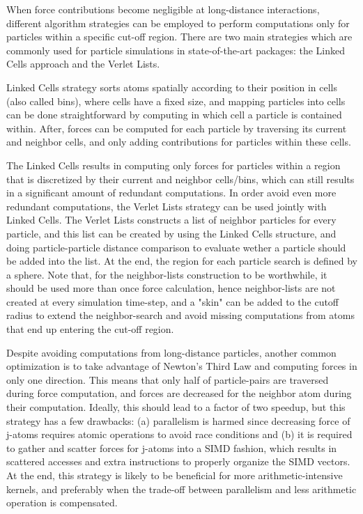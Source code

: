 \documentclass[preprint,12pt]{elsarticle}
\begin{document}
When force contributions become negligible at long-distance interactions, different algorithm strategies can be employed to perform computations only for particles within a specific cut-off region.
There are two main strategies which are commonly used for particle simulations in state-of-the-art packages: the Linked Cells approach and the Verlet Lists.

Linked Cells strategy sorts atoms spatially according to their position in cells (also called bins), where cells have a fixed size, and mapping particles into cells can be done straightforward by computing in which cell a particle is contained within.
After, forces can be computed for each particle by traversing its current and neighbor cells, and only adding contributions for particles within these cells.

The Linked Cells results in computing only forces for particles within a region that is discretized by their current and neighbor cells/bins, which can still results in a significant amount of redundant computations.
In order avoid even more redundant computations, the Verlet Lists strategy can be used jointly with Linked Cells.
The Verlet Lists constructs a list of neighbor particles for every particle, and this list can be created by using the Linked Cells structure, and doing particle-particle distance comparison to evaluate wether a particle should be added into the list.
At the end, the region for each particle search is defined by a sphere.
Note that, for the neighbor-lists construction to be worthwhile, it should be used more than once force calculation, hence neighbor-lists are not created at every simulation time-step, and a "skin" can be added to the cutoff radius to extend the neighbor-search and avoid missing computations from atoms that end up entering the cut-off region.

Despite avoiding computations from long-distance particles, another common optimization is to take advantage of Newton's Third Law and computing forces in only one direction.
This means that only half of particle-pairs are traversed during force computation, and forces are decreased for the neighbor atom during their computation.
Ideally, this should lead to a factor of two speedup, but this strategy has a few drawbacks: (a) parallelism is harmed since decreasing force of j-atoms requires atomic operations to avoid race conditions and (b) it is required to gather and scatter forces for j-atoms into a SIMD fashion, which results in scattered accesses and extra instructions to properly organize the SIMD vectors.
At the end, this strategy is likely to be beneficial for more arithmetic-intensive kernels, and preferably when the trade-off between parallelism and less arithmetic operation is compensated.
\end{document}
